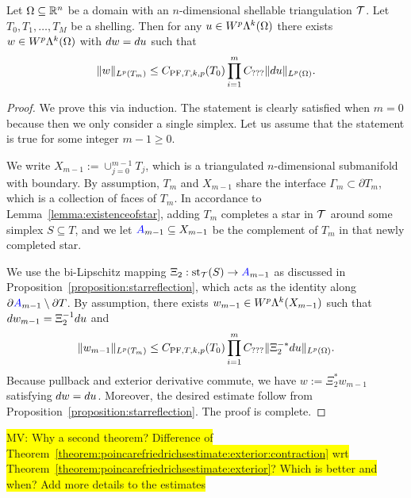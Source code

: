 \documentclass[10pt,a4paper]{article}
\newcommand{\todo}[1]{{\colorbox{yellow}{#1}}}
\begin{document}
\begin{theorem}\label{theorem:poincarefriedrichsestimate:exterior:contraction}
    Let $\Omega \subseteq {\mathbb R}^{n}$ be a domain with an $n$-dimensional shellable triangulation ${\mathcal T}$.
    Let $T_0, T_1, \dots, T_M$ be a shelling.
    Then for any $u \in W^{p}\Lambda^{k}(\Omega)$ 
    there exists $w \in W^{p}\Lambda^{k}(\Omega)$ with $d w = d u$ 
    such that 
    \begin{align*}
        \| w \|_{L^{p}(T_{m})}
        \leq 
        C_{{\rm PF},T,k,p}(T_{0})
        \prod_{i=1}^{m} 
        C_{???}
        \| d u \|_{L^{p}(\Omega)}
        .
    \end{align*}
\end{theorem}
\begin{proof}
    We prove this via induction. 
    The statement is clearly satisfied when $m=0$ because then we only consider a single simplex. 
    Let us assume that the statement is true for some integer $m-1 \geq 0$.
    
    We write $X_{m-1} := \cup_{j=0}^{m-1} T_{j}$, 
    which is a triangulated $n$-dimensional submanifold with boundary.
    By assumption, $T_{m}$ and $X_{m-1}$ share the interface $\Gamma_{m} \subset \partial T_{m}$, 
    which is a collection of faces of $T_{m}$. 
    In accordance to Lemma~\ref{lemma:existenceofstar}, adding $T_{m}$ completes a star in ${\mathcal T}$ around some simplex $S \subseteq T$, 
    and we let ${\color{blue}A}_{m-1} \subseteq X_{m-1}$ be the complement of $T_{m}$ in that newly completed star. 
    
    We use the bi-Lipschitz mapping $\Xi_{2} : \operatorname{st}_{{\mathcal T}}(S) \rightarrow {\color{blue}A}_{m-1}$ as discussed in Proposition~\ref{proposition:starreflection},
    which acts as the identity along $\partial {\color{blue}A}_{m-1} \setminus \partial T$.
    By assumption, 
    there exists $w_{m-1} \in W^{p}\Lambda^{k}(X_{m-1})$ 
    such that $d w_{m-1} = \Xi_{2}^{-1} d u$ and 
    \begin{align*}
        \| w_{m-1} \|_{L^{p}(T_{m})}
        \leq 
        C_{{\rm PF},T,k,p}(T_{0})
        \prod_{i=1}^{m} 
        C_{???}
        \| \Xi_{2}^{-\ast} d u \|_{L^{p}(\Omega)}
        .
    \end{align*}
    Because pullback and exterior derivative commute, 
    we have $w := \Xi_{2}^{\ast} w_{m-1}$ satisfying $d w = d u$. 
    Moreover, the desired estimate follow from Proposition~\ref{proposition:starreflection}.
    The proof is complete. 
\end{proof}
\todo{MV: Why a second theorem? Difference of Theorem~\ref{theorem:poincarefriedrichsestimate:exterior:contraction} wrt Theorem~\ref{theorem:poincarefriedrichsestimate:exterior}? Which is better and when? Add more details to the estimates}
\end{document}
